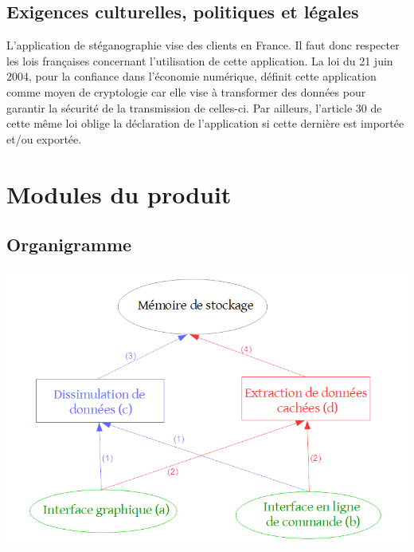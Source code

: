 \documentclass[11pt]{article}
\begin{document}
\subsection{Exigences culturelles, politiques et légales}
L'application de stéganographie vise des clients en France. Il faut donc respecter les lois françaises concernant l'utilisation de cette application. 
La loi du 21 juin 2004, pour la confiance dans l'économie numérique, définit cette application comme moyen de cryptologie car elle vise à transformer des données pour garantir la sécurité de la transmission de celles-ci. 
Par ailleurs, l'article 30 de cette même loi oblige la déclaration de l'application si cette dernière est importée et/ou exportée. 

\section{Modules du produit}

\subsection{Organigramme}

\hspace{1cm}
\includegraphics[scale=0.70]{organigramme.png}
\end{document}
